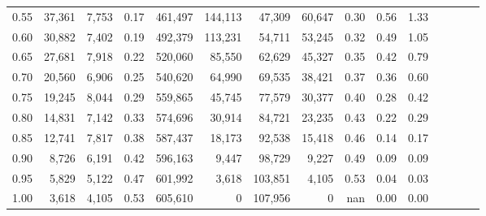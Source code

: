 \begin{tabular}{rrrcrrrrrrrrrrr}
0.55 &  37,361 &  7,753 &                                       0.17 &  461,497 &  144,113 &   47,309 &   60,647 &  0.30 &  0.56 &                         1.33 \\
0.60 &  30,882 &  7,402 &                                       0.19 &  492,379 &  113,231 &   54,711 &   53,245 &  0.32 &  0.49 &                         1.05 \\
0.65 &  27,681 &  7,918 &                                       0.22 &  520,060 &   85,550 &   62,629 &   45,327 &  0.35 &  0.42 &                         0.79 \\
0.70 &  20,560 &  6,906 &                                       0.25 &  540,620 &   64,990 &   69,535 &   38,421 &  0.37 &  0.36 &                         0.60 \\
0.75 &  19,245 &  8,044 &                                       0.29 &  559,865 &   45,745 &   77,579 &   30,377 &  0.40 &  0.28 &                         0.42 \\
0.80 &  14,831 &  7,142 &                                       0.33 &  574,696 &   30,914 &   84,721 &   23,235 &  0.43 &  0.22 &                         0.29 \\
0.85 &  12,741 &  7,817 &                                       0.38 &  587,437 &   18,173 &   92,538 &   15,418 &  0.46 &  0.14 &                         0.17 \\
0.90 &   8,726 &  6,191 &                                       0.42 &  596,163 &    9,447 &   98,729 &    9,227 &  0.49 &  0.09 &                         0.09 \\
0.95 &   5,829 &  5,122 &                                       0.47 &  601,992 &    3,618 &  103,851 &    4,105 &  0.53 &  0.04 &                         0.03 \\
1.00 &   3,618 &  4,105 &                                       0.53 &  605,610 &        0 &  107,956 &        0 &   nan &  0.00 &                         0.00 \\
\bottomrule
\end{tabular}
